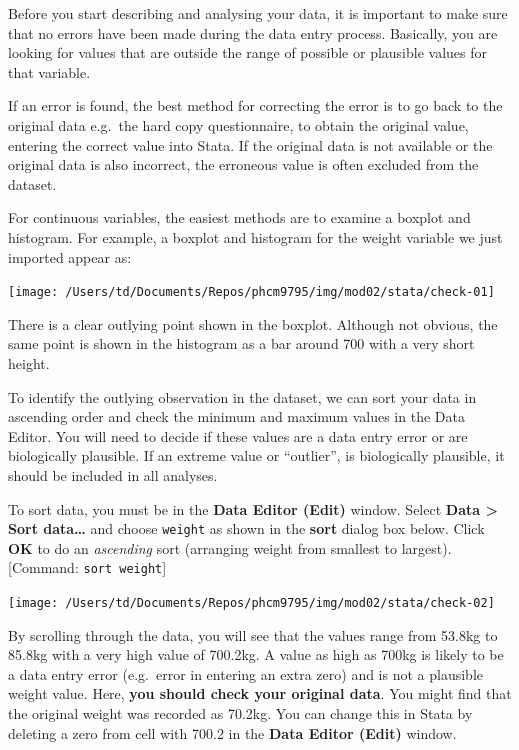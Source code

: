 \documentclass[
]{memoir}
\begin{document}
Before you start describing and analysing your data, it is important to make sure that no errors have been made during the data entry process. Basically, you are looking for values that are outside the range of possible or plausible values for that variable.

If an error is found, the best method for correcting the error is to go back to the original data e.g.~the hard copy questionnaire, to obtain the original value, entering the correct value into Stata. If the original data is not available or the original data is also incorrect, the erroneous value is often excluded from the dataset.

For continuous variables, the easiest methods are to examine a boxplot and histogram. For example, a boxplot and histogram for the weight variable we just imported appear as:

\texttt{[image: /Users/td/Documents/Repos/phcm9795/img/mod02/stata/check-01]}

There is a clear outlying point shown in the boxplot. Although not obvious, the same point is shown in the histogram as a bar around 700 with a very short height.

To identify the outlying observation in the dataset, we can sort your data in ascending order and check the minimum and maximum values in the Data Editor. You will need to decide if these values are a data entry error or are biologically plausible. If an extreme value or ``outlier'', is biologically plausible, it should be included in all analyses.

To sort data, you must be in the \textbf{Data Editor (Edit)} window. Select \textbf{Data \textgreater{} Sort data\ldots{}} and choose \texttt{weight} as shown in the \textbf{sort} dialog box below. Click \textbf{OK} to do an \emph{ascending} sort (arranging weight from smallest to largest). {[}Command: \texttt{sort\ weight}{]}

\texttt{[image: /Users/td/Documents/Repos/phcm9795/img/mod02/stata/check-02]}

By scrolling through the data, you will see that the values range from 53.8kg to 85.8kg with a very high value of 700.2kg. A value as high as 700kg is likely to be a data entry error (e.g.~error in entering an extra zero) and is not a plausible weight value. Here, \textbf{you should check your original data}. You might find that the original weight was recorded as 70.2kg. You can change this in Stata by deleting a zero from cell with 700.2 in the \textbf{Data Editor (Edit)} window.
\end{document}
